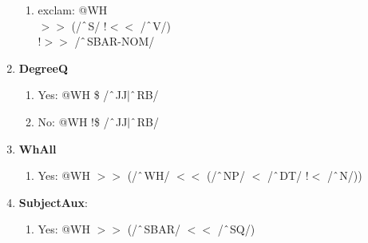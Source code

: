 \begin{enumerate}
\begin{enumerate}
            \item exclam: @WH\\ 
            $>\!\!>$ (/$\string^$S/ !$<\!\!<$ /$\string^$V/) \\
            !$>\!\!>$ /$\string^$SBAR-NOM/
        \end{enumerate}
    \item \textbf{DegreeQ}
        \begin{enumerate}
            \item Yes: @WH \$ /$\string^$JJ$|\string^$RB/
            \item No: @WH !\$ /$\string^$JJ$|\string^$RB/
        \end{enumerate}
    \item \textbf{WhAll}
        \begin{enumerate}
            \item Yes: @WH $>\!\!>$ (/$\string^$WH/ $<\!\!<$ (/$\string^$NP/ $<$ /$\string^$DT/ !$<$ /$\string^$N/))
        \end{enumerate}
    \item \textbf{SubjectAux}: 
        \begin{enumerate}
            \item Yes: @WH $>\!\!>$ (/$\string^$SBAR/ $<\!\!<$ /$\string^$SQ/)
        \end{enumerate}
    
\end{enumerate}

